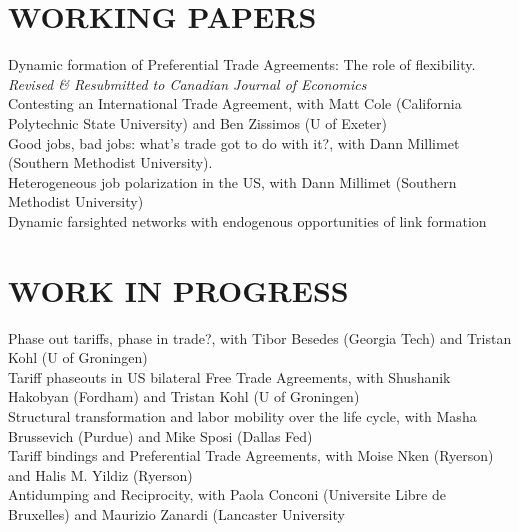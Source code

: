 \documentclass[11pt]{res}
\begin{document}
\begin{resume}
\section{WORKING PAPERS}\vspace{1.5mm}
{Dynamic formation of Preferential Trade Agreements: The role of flexibility}. \emph{Revised \& Resubmitted to Canadian Journal of Economics} \vspace{1.5mm}\\
{Contesting an International Trade Agreement}, with Matt Cole (California Polytechnic State University) and Ben Zissimos (U of Exeter) \vspace{1.5mm}\\
{Good jobs, bad jobs: what's trade got to do with it?}, with Dann Millimet (Southern Methodist University).\vspace{1.5mm}\\
{Heterogeneous job polarization in the US}, with Dann Millimet (Southern Methodist University)\vspace{1.5mm}\\
{Dynamic farsighted networks with endogenous opportunities of link formation}

\section{WORK IN PROGRESS}\vspace{1.5mm}
Phase out tariffs, phase in trade?, with Tibor Besedes (Georgia Tech) and Tristan Kohl (U of Groningen) \vspace{1.5mm}\\
Tariff phaseouts in US bilateral Free Trade Agreements, with Shushanik Hakobyan (Fordham) and Tristan Kohl (U of Groningen)\vspace{1.5mm}\\
Structural transformation and labor mobility over the life cycle, with Masha Brussevich (Purdue) and Mike Sposi (Dallas Fed)\vspace{1.5mm}\\
Tariff bindings and Preferential Trade Agreements, with Moise Nken (Ryerson) and Halis M. Yildiz (Ryerson)\vspace{1.5mm}\\
Antidumping and Reciprocity, with Paola Conconi (Universite Libre de Bruxelles) and Maurizio Zanardi (Lancaster University


\end{resume}
\end{document}
